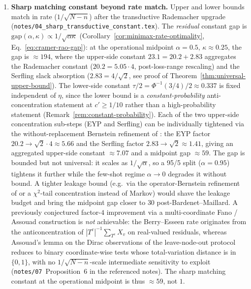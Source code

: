 \documentclass[11pt,a4paper]{article}
\theoremstyle{plain}
\theoremstyle{definition}
\theoremstyle{remark}
\begin{document}
\begin{enumerate}[label=(\arabic*),leftmargin=*]
\item \textbf{Sharp matching constant beyond rate match.}  Upper
    and lower bounds match in rate ($1/\sqrt{N-n}$) after the
    transductive Rademacher upgrade
    (\texttt{notes/04\_sharp\_transductive\_constant.tex}).
    The \emph{residual} constant gap is
    $\mathrm{gap}(\alpha, \kappa) \propto 1/\sqrt{\alpha \kappa}$
    (Corollary~\ref{cor:minimax-rate-optimality},
    Eq.~\eqref{eq:cramer-rao-gap}): at the operational midpoint
    $\alpha = 0.5$, $\kappa \approx 0.25$, the gap is $\approx
    194$, where the upper-side constant $23.1 = 20.2 + 2.83$
    aggregates the \citet[][Thm.~1]{ElYanivPechyony2006}
    Rademacher constant ($20.2 = 5.05 \cdot 4$, post-loss-range
    rescaling) and the Serfling slack absorption ($2.83 =
    4/\sqrt{2}$, see proof of
    Theorem~\ref{thm:universal-upper-bound}). The lower-side
    constant $\tau/2 = \Phi^{-1}(3/4)/2 \approx 0.337$ is fixed
    independent of $\eta$, since the lower bound is a
    \emph{constant-probability} anti-concentration statement at
    $c' \ge 1/10$ rather than a high-probability statement
    (Remark~\ref{rem:constant-probability}).  Each of the two
    upper-side concentration sub-steps (EYP and Serfling) can be
    individually tightened via the without-replacement Bernstein
    refinement of \citet[][Cor.~2.5]{BardenetMaillard2015}: the
    EYP factor $20.2 \to \sqrt 2 \cdot 4 \approx 5.66$ and the
    Serfling factor $2.83 \to \sqrt 2 \approx 1.41$, giving an
    aggregated upper-side constant $\approx 7.07$ and a midpoint
    gap $\approx 59$.  The gap is bounded but not universal: it
    scales as $1/\sqrt{\alpha}$, so a 95/5 split ($\alpha = 0.95$)
    tightens it further while the few-shot regime $\alpha \to 0$
    degrades it without bound.  A tighter leakage bound (e.g.\ via
    the operator-Bernstein refinement of \citealp{Tropp2015} or a
    $\chi^2$-tail concentration instead of Markov) would shave
    the leakage budget and bring the midpoint gap closer to $30$
    post-Bardenet--Maillard.  A previously conjectured factor-$4$
    improvement via a multi-coordinate Fano / Assouad
    construction is \emph{not} achievable: the Berry--Esseen rate
    originates from the anticoncentration of
    $|T^c|^{-1}\sum_{T^c} X_v$ on real-valued residuals, whereas
    Assouad's lemma on the Dirac observations of the
    leave-node-out protocol reduces to binary coordinate-wise
    tests whose total-variation distance is in $\{0, 1\}$, with
    no $1/\sqrt{N-n}$-scale intermediate sensitivity to exploit
    (\texttt{notes/07}~Proposition~6 in the referenced notes).
    The sharp matching constant at the operational midpoint is
    thus $\approx 59$, not $1$.


\end{enumerate}
\end{document}
